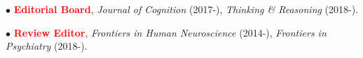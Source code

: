 \documentclass[10pt]{article}
\begin{document}
%	
%	
%	

	
	$\bullet$ \textcolor{red}{{\textbf{Editorial Board}}}, \textit{Journal of Cognition} (2017-), \textit{Thinking \& Reasoning} (2018-).
	\miniskip
	
	$\bullet$ \textcolor{red}{{\textbf{Review Editor}}}, \textit{Frontiers in Human Neuroscience} (2014-), \textit{Frontiers in Psychiatry} (2018-).
	\miniskip
	
\end{document}
